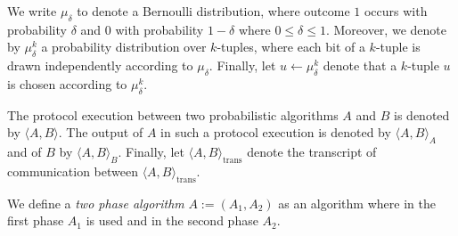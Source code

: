 %
%
\noindent
We write $\mu_{\delta}$ to denote a Bernoulli distribution, where outcome $1$ occurs with probability $\delta$ and $0$ with probability $1-\delta$
where $0 \leq \delta \leq 1$.
Moreover, we denote by $\mu_{\delta}^k$ a probability distribution over $k$-tuples, where each bit of
a $k$-tuple is drawn independently according to $\mu_{\delta}$.
Finally, let $u \leftarrow \mu_{\delta}^k$ denote that a $k$-tuple $u$ is chosen according to $\mu_{\delta}^k$.


The protocol execution between two probabilistic algorithms $A$ and $B$ is denoted by $\langle A, B \rangle$.
The output of $A$ in such a protocol execution is denoted by $\langle A, B \rangle_A$ and of $B$ by $\langle A, B \rangle_B$.
Finally, let $\langle A, B \rangle_{\text{trans}}$ denote the transcript of communication between $\langle A, B \rangle_{\text{trans}}$.

We define a \textit{two phase algorithm} $A := (A_1, A_2)$ as an algorithm where in the first phase $A_1$ is used and in the second phase $A_2$.

